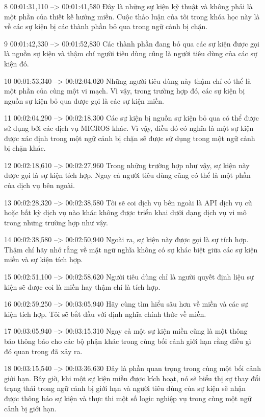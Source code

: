 8
00:01:31,110 --> 00:01:41,580
Đây là những sự kiện kỹ thuật và không phải là một phần của thiết kế hướng miền.  Cuộc thảo luận của tôi trong khóa học này là về các sự kiện bị các thành phần bỏ qua trong ngữ cảnh bị chặn.

9
00:01:42,330 --> 00:01:52,830
Các thành phần đang bỏ qua các sự kiện được gọi là nguồn sự kiện và thậm chí người tiêu dùng cũng là người tiêu dùng của các sự kiện đó.

10
00:01:53,340 --> 00:02:04,020
Những người tiêu dùng này thậm chí có thể là một phần của cùng một vi mạch.  Vì vậy, trong trường hợp đó, các sự kiện bị nguồn sự kiện bỏ qua được gọi là các sự kiện miền.

11
00:02:04,290 --> 00:02:18,300
Các sự kiện bị nguồn sự kiện bỏ qua có thể được sử dụng bởi các dịch vụ MICROS khác.  Vì vậy, điều đó có nghĩa là một sự kiện được xác định trong một ngữ cảnh bị chặn sẽ được sử dụng trong một ngữ cảnh bị chặn khác.

12
00:02:18,610 --> 00:02:27,960
Trong những trường hợp như vậy, sự kiện này được gọi là sự kiện tích hợp.  Ngay cả người tiêu dùng cũng có thể là một phần của dịch vụ bên ngoài.

13
00:02:28,320 --> 00:02:38,580
Tôi sẽ coi dịch vụ bên ngoài là API dịch vụ cũ hoặc bất kỳ dịch vụ nào khác không được triển khai dưới dạng dịch vụ vi mô trong những trường hợp như vậy.

14
00:02:38,580 --> 00:02:50,940
Ngoài ra, sự kiện này được gọi là sự tích hợp.  Thậm chí hãy nhớ rằng về mặt ngữ nghĩa không có sự khác biệt giữa các sự kiện miền và sự kiện tích hợp.

15
00:02:51,100 --> 00:02:58,620
Người tiêu dùng chỉ là người quyết định liệu sự kiện sẽ được coi là miền hay thậm chí là tích hợp.

16
00:02:59,250 --> 00:03:05,940
Hãy cùng tìm hiểu sâu hơn về miền và các sự kiện tích hợp.  Tôi sẽ bắt đầu với định nghĩa chính thức về miền.

17
00:03:05,940 --> 00:03:15,310
Ngay cả một sự kiện miền cũng là một thông báo thông báo cho các bộ phận khác trong cùng bối cảnh giới hạn rằng điều gì đó quan trọng đã xảy ra.

18
00:03:15,540 --> 00:03:36,630
Đây là phần quan trọng trong cùng một bối cảnh giới hạn.  Bây giờ, khi một sự kiện miền được kích hoạt, nó sẽ biểu thị sự thay đổi trạng thái trong ngữ cảnh bị giới hạn và người tiêu dùng của sự kiện sẽ nhận được thông báo sự kiện và thực thi một số logic nghiệp vụ trong cùng một ngữ cảnh bị giới hạn.

